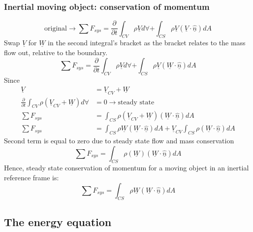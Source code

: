 \documentclass[class=report, crop=false, 12pt,a4paper]{standalone}
\begin{document}
\subsubsection{Inertial moving object: conservation of momentum}
\begin{equation}
  \textrm{original} \rightarrow \sum F_{sys} = \frac{\partial}{\partial t} \int_{CV} \rho \underline{V} d \forall + \int_{CS} \rho \underline{V} (\underline{V}\cdot \underline{\hat{n}}) dA 
\end{equation}
Swap $\underline{V}$ for $\underline{W}$ in the second integral's bracket as the bracket relates to the mass flow out, relative to the boundary. 
\begin{equation}
  \sum F_{sys} = \frac{\partial}{\partial t} \int_{CV} \rho \underline{V} d \forall + \int_{CS} \rho \underline{V} (\underline{W}\cdot \underline{\hat{n}}) dA 
\end{equation}
Since
\begin{align}
  \underline{V} &= \underline{V}_{CV} + \underline{W}\\
  \frac{\partial}{\partial t} \int_{CV} \rho (\underline{V}_{CV} + \underline{W}) d \forall &= 0 \rightarrow \textrm{steady state}\\
  \sum F_{sys} &= \int_{CS} \rho (\underline{V}_{CV} + \underline{W}) (\underline{W}\cdot \underline{\hat{n}}) dA \\
  \sum F_{sys} &= \int_{CS} \rho \underline{W}(\underline{W}\cdot \underline{\hat{n}}) dA + \underline{V}_{CV} \int_{CS} \rho (\underline{W}\cdot \underline{\hat{n}}) dA
\end{align}
Second term is equal to zero due to steady state flow and mass conservation
\begin{equation}
  \sum F_{sys} = \int_{CS} \rho (\underline{W})(\underline{W}\cdot \underline{\hat{n}}) dA 
\end{equation}
Hence, steady state conservation of momentum for a moving object in an inertial reference frame is: 
\begin{equation}
  \sum F_{sys} = \int_{CS} \rho \underline{W} (\underline{W}\cdot \underline{\hat{n}}) dA
\end{equation}
\subsection{The energy equation}
\end{document}
